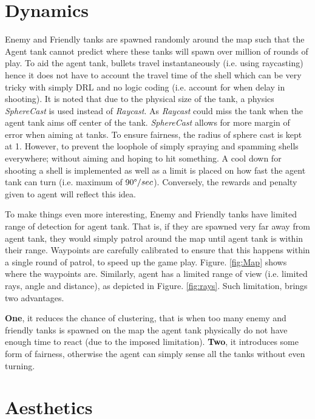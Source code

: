 \section{Dynamics}

Enemy and Friendly tanks are spawned randomly around the map such that the Agent tank cannot predict where these tanks will spawn over million of rounds of play. To aid the agent tank, bullets travel instantaneously (i.e. using raycasting) hence it does not have to account the travel time of the shell which can be very tricky with simply DRL and no logic coding (i.e. account for when delay in shooting). It is noted that due to the physical size of the tank, a physics \textit{SphereCast} is used instead of \textit{Raycast}. As \textit{Raycast} could miss the tank when the agent tank aims off center of the tank. \textit{SphereCast} allows for more margin of error when aiming at tanks. To ensure fairness, the radius of sphere cast is kept at 1.
However, to prevent the loophole of simply spraying and spamming shells everywhere; without aiming and hoping to hit something. A cool down for shooting a shell is implemented as well as a limit is placed on how fast the agent tank can turn (i.e. maximum of $90\degree / sec $). Conversely, the rewards and penalty given to agent will reflect this idea.

To make things even more interesting, Enemy and Friendly tanks have limited range of detection for agent tank. That is, if they are spawned very far away from agent tank, they would simply patrol around the map until agent tank is within their range. Waypoints are carefully calibrated to ensure that this happens within a single round of patrol, to speed up the game play. Figure. \ref{fig:Map} shows where the waypoints are. Similarly, agent has a limited range of view (i.e. limited rays, angle and distance), as depicted in Figure. \ref{fig:rays}. Such limitation, brings two advantages. 

\textbf{One}, it reduces the chance of clustering, that is when too many enemy and friendly tanks is spawned on the map the agent tank physically do not have enough time to react (due to the imposed limitation). \textbf{Two}, it introduces some form of fairness, otherwise the agent can simply sense all the tanks without even turning.

\section{Aesthetics}

